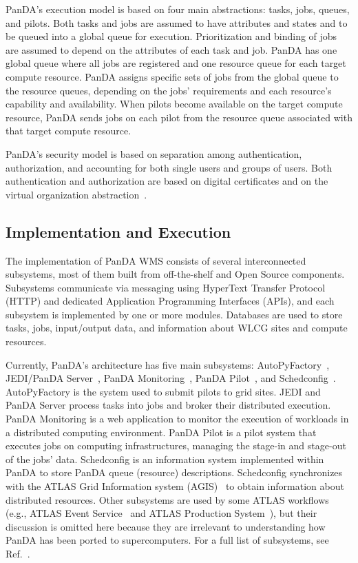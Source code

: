 PanDA's execution model is based on four main abstractions: tasks, jobs,
queues, and pilots. Both tasks and jobs are assumed to have attributes and
states and to be queued into a global queue for execution. Prioritization and
binding of jobs are assumed to depend on the attributes of each task and job.
PanDA has one global queue where all jobs are registered and one resource queue
for each target compute resource. PanDA assigns specific sets of jobs from
the global queue to the resource queues, depending on the jobs' requirements
and each resource's capability and availability. When pilots become available
on the target compute resource, PanDA sends jobs on each pilot from the
resource queue associated with that target compute resource.

PanDA's security model is based on separation among authentication,
authorization, and accounting for both single users and groups of users. Both
authentication and authorization are based on digital certificates and on the
virtual organization abstraction~\cite{foster2001anatomy}. 


\subsection{Implementation and Execution}
\label{subsec:implementation}

The implementation of PanDA WMS consists of several interconnected
subsystems, most of them built from off-the-shelf and Open Source components.
Subsystems communicate via messaging using HyperText Transfer Protocol (HTTP)
and dedicated Application Programming Interfaces (APIs), and each
subsystem is implemented by one or more modules. Databases are used to store
tasks, jobs, input/output data, and information about WLCG sites and compute
resources.

Currently, PanDA's architecture has five main subsystems:
AutoPyFactory~\cite{caballero2012autopyfactory},
JEDI/PanDA Server~\cite{maeno2011overview,borodin2015scaling},
PanDA Monitoring~\cite{klimentov2011atlas},
PanDA Pilot~\cite{nilsson2011atlas}, and Schedconfig~\cite{nilsson2008panda}.
AutoPyFactory is the system used to submit pilots to grid sites. JEDI and PanDA
Server process tasks into jobs and broker their distributed execution. PanDA
Monitoring is a web application to monitor the execution of workloads in a
distributed computing environment. PanDA Pilot is a pilot system that executes
jobs on computing infrastructures, managing the stage-in and stage-out of the
jobs' data. Schedconfig is an information system implemented within PanDA to
store PanDA queue (resource) descriptions. Schedconfig synchronizes with the
ATLAS Grid Information system (AGIS)~\cite{anisenkov2014agis} to obtain
information about distributed resources. Other subsystems are used by some
ATLAS workflows (e.g., ATLAS Event Service~\cite{calafiura2015atlas} and ATLAS
Production System~\cite{borodin2016atlas}), but their discussion is omitted
here because they are irrelevant to understanding how PanDA has been ported to
supercomputers. For a full list of subsystems, see Ref.~\cite{panda-wiki_url}.

